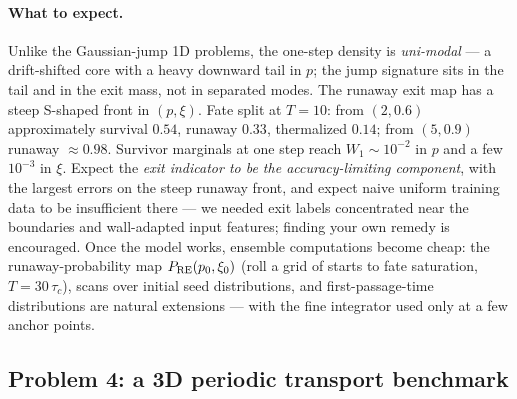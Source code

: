\documentclass[11pt]{article}
\begin{document}
\paragraph{What to expect.} Unlike the Gaussian-jump 1D problems, the
one-step density is \emph{uni-modal} --- a drift-shifted core with a
heavy downward tail in $p$; the jump signature sits in the tail and in
the exit mass, not in separated modes. The runaway exit map has a steep
S-shaped front in $(p,\xi)$. Fate split at $T=10$: from $(2,0.6)$
approximately survival $0.54$, runaway $0.33$, thermalized $0.14$; from
$(5,0.9)$ runaway $\approx0.98$. Survivor marginals at one step reach
$W_1\sim10^{-2}$ in $p$ and a few $10^{-3}$ in $\xi$. Expect the
\emph{exit indicator to be the accuracy-limiting component}, with the
largest errors on the steep runaway front, and expect naive uniform
training data to be insufficient there --- we needed exit labels
concentrated near the boundaries and wall-adapted input features; finding
your own remedy is encouraged. Once the model works, ensemble
computations become cheap: the runaway-probability map
$P_{\rm RE}(p_0,\xi_0)$ (roll a grid of starts to fate saturation,
$T=30\,\tau_c$), scans over initial seed distributions, and
first-passage-time distributions are natural extensions --- with the fine
integrator used only at a few anchor points.

\subsection{Problem 4: a 3D periodic transport benchmark}
\end{document}
